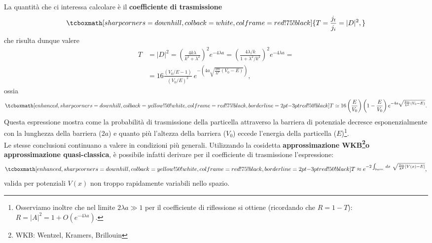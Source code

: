 La quantità che ci interessa calcolare è il \textbf{coefficiente di trasmissione}
	\begin{equation}
		\tcboxmath[sharp corners=downhill, colback=white, colframe=red!75!black]{
			T=\frac{j_t}{j_i}=|D|^2,
			}
	\end{equation}
che risulta dunque valere
	\begin{align}
		T &= |D|^2= \left(\frac{4k\lambda}{k^2+\lambda ^2} \right) ^2 e^{-4\lambda a} =\left(\frac{4\lambda /k}{1+\lambda ^2/k^2} \right) ^2 e^{-4\lambda a}= \nonumber \\[0.3cm]
		&=16\frac{\left(V_0 /E-1\right)}{\left(V_0 /E \right) ^2}\ e^{-\left(4a\sqrt{\frac{2m}{\hbar ^2}\left(V_0-E\right)}\right)},
	\end{align}
ossia
	\begin{equation}
		\tcboxmath[enhanced, sharp corners=downhill, colback=yellow!50!white, colframe=red!75!black, borderline={2pt}{-3pt}{red!50!black}]{
			T \simeq 16 \left(\frac{E}{V_0} \right) \left(1-\frac{E}{V_0}\right) e^{-4a\sqrt{\frac{2m}{\hbar ^2}\left(V_0-E\right)}}.
			}
	\end{equation}
Questa espressione mostra come la probabilità di trasmissione della particella attraverso la barriera di potenziale decresce esponenzialmente con la lunghezza della barriera ($2a$) e quanto più l'altezza della barriera ($V_0$) eccede l'energia della particella ($E$)\footnote{Osserviamo inoltre che nel limite $2\lambda a \gg 1 $ per il coefficiente di riflessione si ottiene (ricordando che $R=1-T$): $
 R=|A|^2=1+O(e^{-4\lambda a})$.}.\\

Le stesse conclusioni continuano a valere in condizioni più generali. Utilizzando la cosidetta \textbf{approssimazione WKB\footnote{WKB: Wentzel, Kramers, Brillouin}o approssimazione quasi-classica}, è possibile infatti derivare per il coefficiente di trasmissione l'espressione:
	\begin{equation}
		\tcboxmath[enhanced, sharp corners=downhill, colback=yellow!50!white, colframe=red!75!black, borderline={2pt}{-3pt}{red!50!black}]{
			T \approx e^{-2 \int_{barr.} dx\ \sqrt{\frac{2m}{\hbar ^2}\left[ V(x)-E \right]}},
			}
		 \end{equation}
valida per potenziali $V(x)$ non troppo rapidamente variabili nello spazio.\\

